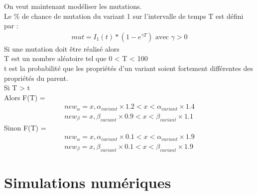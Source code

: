 \documentclass{article}
\begin{document}
\noindent
On veut maintenant modéliser les mutations.\\
Le \% de chance de mutation du variant 1 sur l'intervalle de temps T est défini par :
\begin{align}
    mut = I_1(t)*(1-e^{\gamma T})\text{ avec }\gamma > \text{0}
\end{align}
\noindent
Si une mutation doit être réalisé alors \\
\noindent
T est un nombre aléatoire tel que 0 < T < 100 \\
t est la probabilité que les propriétés d'un variant soient fortement différentes des propriétés du parent.\\
Si T > t \\
Alors F(T) =
\begin{align}
    new_\alpha = x, \alpha_{variant} \times 1.2 < x < \alpha_{variant} \times 1.4 \\
    new_\beta = x, \beta_{variant} \times 0.9 < x < \beta_{variant} \times 1.1
\end{align}
\noindent
Sinon F(T) = \\
\begin{align}
    new_\alpha= x, \alpha_{variant} \times 0.1 < x < \alpha_{variant} \times 1.9 \\
    new_\beta= x, \beta_{variant} \times 0.1 < x < \beta_{variant} \times 1.9
\end{align}


\section{Simulations numériques}
\end{document}
